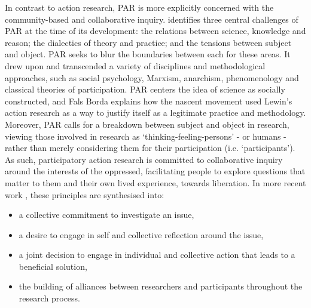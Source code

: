 In contrast to action research, PAR is more explicitly concerned with the community-based and collaborative inquiry. \citet{fals_borda_kinsey_2001} identifies three central challenges of PAR at the time of its development: the relations between science, knowledge and reason; the dialectics of theory and practice; and the tensions between subject and object. PAR seeks to blur the boundaries between each for these areas. It drew upon and transcended a variety of disciplines and methodological approaches, such as social psychology, Marxism, anarchism, phenomenology and classical theories of participation. PAR centers the idea of science as socially constructed, and Fals Borda explains how the nascent movement used Lewin’s action research as a way to justify itself as a legitimate practice and methodology. Moreover, PAR calls for a breakdown between subject and object in research, viewing those involved in research as ‘thinking-feeling-persons’ - or humans - rather than merely considering them for their participation (i.e. ‘participants’). As such, participatory action research is committed to collaborative inquiry around the interests of the oppressed, facilitating people to explore questions that matter to them and their own lived experience, towards liberation. In more recent work \citep{mcintyre_participatory_2007}, these principles are synthesised into:
\begin{itemize}
    \item a collective commitment to investigate an issue,
    \item a desire to engage in self and collective reflection around the issue,
    \item a joint decision to engage in individual and collective action that leads to a beneficial solution,
    \item the building of alliances between researchers and participants throughout the research process.
\end{itemize}

